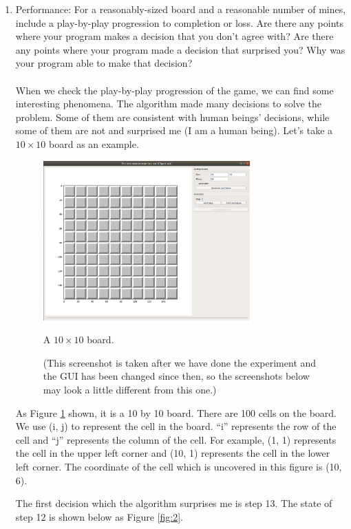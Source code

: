\documentclass[letter]{article}
\begin{document}
\begin{enumerate}
	\label{han}
	\item {Performance: For a reasonably-sized board and a reasonable number of mines, include a play-by-play progression to completion or loss. Are there any points where your program makes a decision that you don’t agree with? Are there any points where your program made a decision that surprised you? Why was your program able to make that decision?} \\
	\\
	When we check the play-by-play progression of the game, we can find some interesting phenomena. The algorithm made many decisions to solve the problem. Some of them are consistent with human beings’ decisions, while some of them are not and surprised me (I am a human being). Let’s take a $ 10 \times 10 $ board as an example.
	
	\begin{figure}[H]
		\centering
		\includegraphics[width=0.75\textwidth]{../pics/1.png}
		\caption{\label{fig:1} A $ 10 \times 10 $ board. }
		\caption*{(This screenshot is taken after we have done the experiment and the GUI has been changed since then, so the screenshots below may look a little different from this one.)}
	\end{figure}
	As Figure \ref{fig:1} shown, it is a 10 by 10 board. There are 100 cells on the board. We use (i, j) to represent the cell in the board. ``i'' represents the row of the cell and ``j'' represents the column of the cell. For example, (1, 1) represents the cell in the upper left corner and (10, 1) represents the cell in the lower left corner. The coordinate of the cell which is uncovered in this figure is (10, 6).
	
	The first decision which the algorithm surprises me is step 13. The state of step 12 is shown below as Figure \ref{fig:2}.
	

\end{enumerate}
\end{document}
